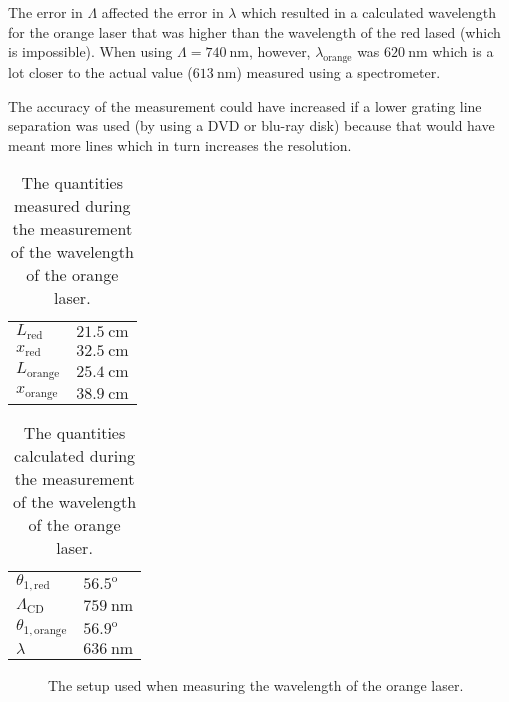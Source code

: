 \documentclass[12pt,a4paper]{article}
\begin{document}
The error in $\Lambda$ affected the error in $\lambda$ which resulted in a calculated wavelength for the orange laser that was higher than the wavelength of the red lased (which is impossible). When using $\Lambda=\SI{740}{\nano\metre}$, however, $\lambda_\text{orange}$ was $\SI{620}{\nano\metre}$ which is a lot closer to the actual value ($\SI{613}{\nano\metre}$) measured using a spectrometer.

The accuracy of the measurement could have increased if a lower grating line separation was used (by using a DVD or blu-ray disk) because that would have meant more lines which in turn increases the resolution.
\begin{table}
  \centering
  \begin{tabular}{|l|l|}\hline
    $L_\text{red}$ & $\SI{21.5}{\centi\metre}$ \\
    $x_\text{red}$ & $\SI{32.5}{\centi\metre}$ \\
    $L_\text{orange}$ & $\SI{25.4}{\centi\metre}$ \\
    $x_\text{orange}$ & $\SI{38.9}{\centi\metre}$ \\ \hline
  \end{tabular}
  \caption{The quantities measured during the measurement of the wavelength of the orange laser.}
  \label{tab:diffraction_orange_vals}
\end{table}
\begin{table}
  \centering
  \begin{tabular}{|l|l|}\hline
    $\theta_{1,\text{red}}$ & $56.5^\text{o}$ \\
    $\Lambda_\text{CD}$ & $\SI{759}{\nano\metre}$ \\
    $\theta_{1,\text{orange}}$ & $56.9^\text{o}$ \\
    $\lambda$ & $\SI{636}{\nano\metre}$ \\ \hline
  \end{tabular}
  \caption{The quantities calculated during the measurement of the wavelength of the orange laser.}
  \label{tab:diffraction_orange_calcs}
\end{table}
\begin{figure}
  \centering
  \noindent\makebox[\textwidth]{\scalebox{0.90}{}}
  \caption{The setup used when measuring the wavelength of the orange laser.}
  \label{fig:diffraction_orange}
\end{figure}
\end{document}
